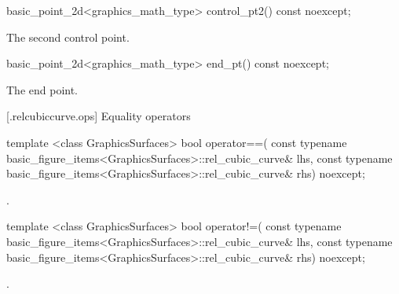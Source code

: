 %
\begin{itemdecl}
basic_point_2d<graphics_math_type> control_pt2() const noexcept;
\end{itemdecl}
\begin{itemdescr}
\pnum
\returns The second control point.
\end{itemdescr}

%
\begin{itemdecl}
basic_point_2d<graphics_math_type> end_pt() const noexcept;
\end{itemdecl}
\begin{itemdescr}
\pnum
\returns The end point.
\end{itemdescr}

 [\iotwod.relcubiccurve.ops] {Equality operators}%

%
\begin{itemdecl}
template <class GraphicsSurfaces>
bool operator==(
  const typename basic_figure_items<GraphicsSurfaces>::rel_cubic_curve& lhs,
  const typename basic_figure_items<GraphicsSurfaces>::rel_cubic_curve& rhs) 
  noexcept;
\end{itemdecl}
\begin{itemdescr}
\pnum
\returns
{}.
\end{itemdescr}

%
\begin{itemdecl}
template <class GraphicsSurfaces>
bool operator!=(
  const typename basic_figure_items<GraphicsSurfaces>::rel_cubic_curve& lhs,
  const typename basic_figure_items<GraphicsSurfaces>::rel_cubic_curve& rhs) 
  noexcept;
\end{itemdecl}
\begin{itemdescr}
\pnum
\returns
{}.
\end{itemdescr}
